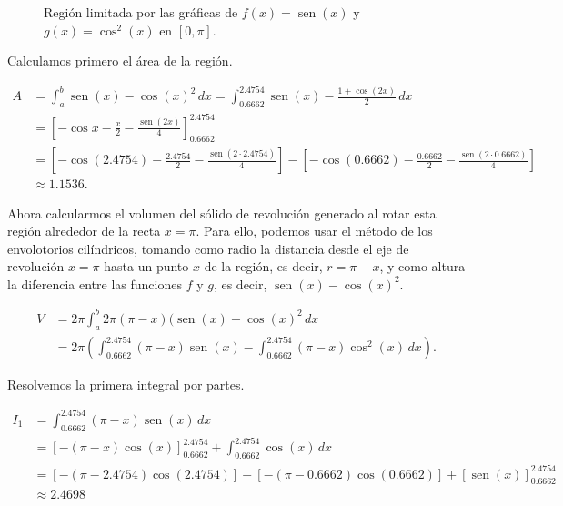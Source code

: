 \documentclass[
  spanish,
  a4paper,
]{scrreport}
\theoremstyle{definition}
\theoremstyle{remark}
\begin{document}
\begin{tcolorbox}
\begin{figure}[H]
{}

\caption{Región limitada por las gráficas de
\(f(x)=\operatorname{sen}(x)\) y \(g(x)=\cos^2(x)\) en \([0, \pi]\).}

\end{figure}%

Calculamos primero el área de la región.

\begin{align*}
A 
&= \int_a^b \operatorname{sen}(x) - \cos(x)^2\,dx 
= \int_{0.6662}^{2.4754} \operatorname{sen}(x)- \frac{1+\cos(2x)}{2} \,dx \\
&= \left[-\cos x - \frac{x}{2} - \frac{\operatorname{sen}(2x)}{4}\right]_{0.6662}^{2.4754} \\
&= \left[-\cos(2.4754) - \frac{2.4754}{2} - \frac{\operatorname{sen}(2\cdot 2.4754)}{4}\right] - \left[-\cos(0.6662) - \frac{0.6662}{2} - \frac{\operatorname{sen}(2\cdot 0.6662)}{4}\right] \\
&\approx 1.1536.
\end{align*}

Ahora calcularmos el volumen del sólido de revolución generado al rotar
esta región alrededor de la recta \(x=\pi\). Para ello, podemos usar el
método de los envolotorios cilíndricos, tomando como radio la distancia
desde el eje de revolución \(x=\pi\) hasta un punto \(x\) de la región,
es decir, \(r = \pi - x\), y como altura la diferencia entre las
funciones \(f\) y \(g\), es decir,
\(\operatorname{sen}(x) - \cos(x)^2\).

\begin{align*}
V 
&= 2\pi \int_a^b 2\pi (\pi - x)(\operatorname{sen}(x) - \cos(x)^2\,dx \\
&= 2\pi\left(\int_{0.6662}^{2.4754} (\pi - x)\operatorname{sen}(x) - \int_{0.6662}^{2.4754} (\pi - x)\cos^2(x)\,dx \right).
\end{align*}

Resolvemos la primera integral por partes.

\begin{align*}
I_1 
&= \int_{0.6662}^{2.4754} (\pi - x)\operatorname{sen}(x) \,dx  \\
&= \left[-(\pi - x)\cos(x)\right]_{0.6662}^{2.4754} + \int_{0.6662}^{2.4754} \cos(x)\, dx \\
&= \left[-(\pi - 2.4754)\cos(2.4754)\right] - \left[-(\pi - 0.6662)\cos(0.6662)\right] + \left[\operatorname{sen}(x)\right]_{0.6662}^{2.4754} \\
&\approx 2.4698
\end{align*}


\end{tcolorbox}
\end{document}
